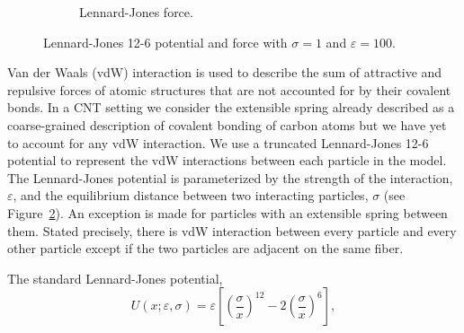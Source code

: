 \begin{figure}[t]
\begin{subfigure}[t]{.5\textwidth}
			\caption{Lennard-Jones force. \label{subfig:LJForce}}
		\end{subfigure}		
		\caption{Lennard-Jones 12-6 potential and force with $\sigma = 1$ and $\varepsilon = 100$.\label{fig:LJ}}	
	\end{figure}

Van der Waals (vdW) interaction is used to describe the sum of attractive and repulsive forces of atomic structures that are not accounted for by their covalent bonds. In a CNT setting we consider the extensible spring already described as a coarse-grained description of covalent bonding of carbon atoms but we have yet to account for any vdW interaction. We use a truncated Lennard-Jones 12-6 potential to represent the vdW interactions between each particle in the model. The Lennard-Jones potential is parameterized by the strength of the interaction, $\varepsilon$, and the equilibrium distance between two interacting particles, $\sigma$ (see Figure~\ref{fig:LJ}). An exception is made for particles with an extensible spring between them. Stated precisely, there is vdW interaction between every particle and every other particle except if the two particles are adjacent on the same fiber.
	
The standard Lennard-Jones potential,
\begin{equation}
	U(x; \varepsilon, \sigma) = \varepsilon \left[ \left( \frac{\sigma}{x} \right)^{12} - 2 \left( \frac{\sigma}{x} \right)^6 \right],
\end{equation}

